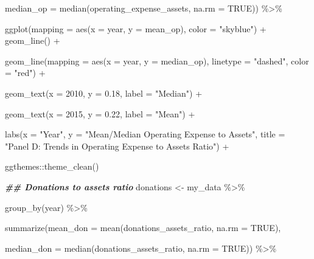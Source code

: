 \documentclass[a4paper,nobind]{templates/ociamthesis}
\newenvironment{Shaded}{\begin{snugshade}}{\end{snugshade}}
\newcommand{\AttributeTok}[1]{\textcolor[rgb]{0.77,0.63,0.00}{#1}}
\newcommand{\ConstantTok}[1]{\textcolor[rgb]{0.00,0.00,0.00}{#1}}
\newcommand{\DecValTok}[1]{\textcolor[rgb]{0.00,0.00,0.81}{#1}}
\newcommand{\DocumentationTok}[1]{\textcolor[rgb]{0.56,0.35,0.01}{\textbf{\textit{#1}}}}
\newcommand{\FloatTok}[1]{\textcolor[rgb]{0.00,0.00,0.81}{#1}}
\newcommand{\FunctionTok}[1]{\textcolor[rgb]{0.00,0.00,0.00}{#1}}
\newcommand{\NormalTok}[1]{#1}
\newcommand{\OtherTok}[1]{\textcolor[rgb]{0.56,0.35,0.01}{#1}}
\newcommand{\SpecialCharTok}[1]{\textcolor[rgb]{0.00,0.00,0.00}{#1}}
\newcommand{\StringTok}[1]{\textcolor[rgb]{0.31,0.60,0.02}{#1}}
\renewenvironment{Shaded}
{
  \vspace{10pt}%
  \begin{snugshade}%
}{%
  \end{snugshade}%
  \vspace{8pt}%
}
\begin{document}
\begin{Shaded}
\begin{Highlighting}[]
  \AttributeTok{median\_op =} \FunctionTok{median}\NormalTok{(operating\_expense\_assets, }\AttributeTok{na.rm =} \ConstantTok{TRUE}\NormalTok{)) }\SpecialCharTok{\%\textgreater{}\%} 
  
  \FunctionTok{ggplot}\NormalTok{(}\AttributeTok{mapping =} \FunctionTok{aes}\NormalTok{(}\AttributeTok{x =}\NormalTok{ year, }\AttributeTok{y =}\NormalTok{ mean\_op), }\AttributeTok{color =} \StringTok{"skyblue"}\NormalTok{) }\SpecialCharTok{+} \FunctionTok{geom\_line}\NormalTok{() }\SpecialCharTok{+}
  
  \FunctionTok{geom\_line}\NormalTok{(}\AttributeTok{mapping =} \FunctionTok{aes}\NormalTok{(}\AttributeTok{x =}\NormalTok{ year, }\AttributeTok{y =}\NormalTok{ median\_op), }\AttributeTok{linetype =} \StringTok{"dashed"}\NormalTok{, }\AttributeTok{color =} \StringTok{"red"}\NormalTok{) }\SpecialCharTok{+}
  
  \FunctionTok{geom\_text}\NormalTok{(}\AttributeTok{x =} \DecValTok{2010}\NormalTok{, }\AttributeTok{y =} \FloatTok{0.18}\NormalTok{, }\AttributeTok{label =} \StringTok{"Median"}\NormalTok{) }\SpecialCharTok{+} 
  
  \FunctionTok{geom\_text}\NormalTok{(}\AttributeTok{x =} \DecValTok{2015}\NormalTok{, }\AttributeTok{y =} \FloatTok{0.22}\NormalTok{, }\AttributeTok{label =} \StringTok{"Mean"}\NormalTok{) }\SpecialCharTok{+}
  
  \FunctionTok{labs}\NormalTok{(}\AttributeTok{x =} \StringTok{"Year"}\NormalTok{, }\AttributeTok{y =} \StringTok{"Mean/Median Operating Expense to Assets"}\NormalTok{, }\AttributeTok{title =} \StringTok{"Panel D: Trends in Operating Expense to Assets Ratio"}\NormalTok{) }\SpecialCharTok{+} 
  
\NormalTok{  ggthemes}\SpecialCharTok{::}\FunctionTok{theme\_clean}\NormalTok{()}

\DocumentationTok{\#\# Donations to assets ratio}
\NormalTok{donations }\OtherTok{\textless{}{-}}\NormalTok{ my\_data }\SpecialCharTok{\%\textgreater{}\%} 
  
  \FunctionTok{group\_by}\NormalTok{(year) }\SpecialCharTok{\%\textgreater{}\%} 
  
  \FunctionTok{summarize}\NormalTok{(}\AttributeTok{mean\_don =} \FunctionTok{mean}\NormalTok{(donations\_assets\_ratio, }\AttributeTok{na.rm =} \ConstantTok{TRUE}\NormalTok{), }
                               
  \AttributeTok{median\_don =} \FunctionTok{median}\NormalTok{(donations\_assets\_ratio, }\AttributeTok{na.rm =} \ConstantTok{TRUE}\NormalTok{)) }\SpecialCharTok{\%\textgreater{}\%} 
  

\end{Highlighting}
\end{Shaded}
\end{document}
